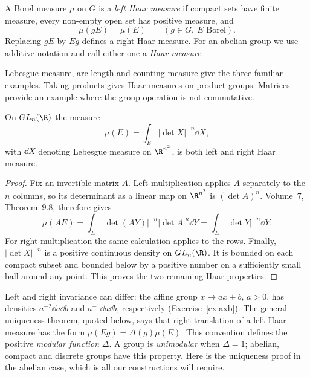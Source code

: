 \begin{definition}
A Borel measure $\mu$ on $G$ is a \emph{left Haar measure} if compact sets have finite measure, every non-empty open set has positive measure, and
\[\mu(gE)=\mu(E)\qquad(g\in G,\ E\text{ Borel}).\]
Replacing $gE$ by $Eg$ defines a right Haar measure. For an abelian group we use additive notation and call either one a \emph{Haar measure}.
\end{definition}

Lebesgue measure, arc length and counting measure give the three familiar examples. Taking products gives Haar measures on product groups. Matrices provide an example where the group operation is not commutative.

\begin{proposition}\label{prop:glnhaar}
On $GL_n(\R)$ the measure
\[\mu(E)=\int_E|\det X|^{-n}\dd X,\]
with $\dd X$ denoting Lebesgue measure on $\R^{n^2}$, is both left and right Haar measure.
\end{proposition}
\begin{proof}
Fix an invertible matrix $A$. Left multiplication applies $A$ separately to the $n$ columns, so its determinant as a linear map on $\R^{n^2}$ is $(\det A)^n$. Volume~7, Theorem~9.8, therefore gives
\[\mu(AE)=\int_E|\det(AY)|^{-n}|\det A|^n\dd Y=\int_E|\det Y|^{-n}\dd Y.\]
For right multiplication the same calculation applies to the rows. Finally, $|\det X|^{-n}$ is a positive continuous density on $GL_n(\R)$. It is bounded on each compact subset and bounded below by a positive number on a sufficiently small ball around any point. This proves the two remaining Haar properties.
\end{proof}

Left and right invariance can differ: the affine group $x\mapsto ax+b$, $a>0$, has densities $a^{-2}\dd a\dd b$ and $a^{-1}\dd a\dd b$, respectively (Exercise~\ref{ex:axb}). The general uniqueness theorem, quoted below, says that right translation of a left Haar measure has the form $\mu(Eg)=\Delta(g)\mu(E)$. This convention defines the positive \emph{modular function} $\Delta$. A group is \emph{unimodular} when $\Delta=1$; abelian, compact and discrete groups have this property. Here is the uniqueness proof in the abelian case, which is all our constructions will require.


